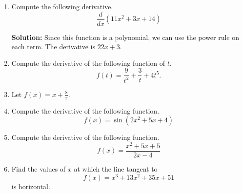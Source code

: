 \documentclass{article}
\begin{document}
\ActivityTitle[class=Calculus I, number=3, name=Differentiation I (Solutions)]

\begin{enumerate}
\item Compute the following derivative. \[ \frac{d}{dx} \left( 11 x^2 + 3 x + 14 \right) \]

\textbf{Solution:}
Since this function is a polynomial, we can use the power rule on each term. The derivative is $22 x + 3$.

  
\vspace{1cm}

\item Compute the derivative of the following function of $t$. \[ f(t) = \frac{9}{t^{2}} + \frac{3}{t} + 4 t^{5}. \]

  
\vspace{1cm}

\item Let $f(x) = x + \frac{8}{x}$.

  
\vspace{1cm}

\item Compute the derivative of the following function. \[ f(x) = \sin(2 x^2 + 5 x + 4) \]

  
\vspace{1cm}

\item Compute the derivative of the following function. \[ f(x) = \frac{x^2 + 5 x + 5}{2 x - 4} \]

  
\vspace{1cm}

\item Find the values of $x$ at which the line tangent to \[ f(x) = x^3 + 13 x^2 + 35 x + 51 \] is horizontal.

  
\vspace{1cm}
\end{enumerate}
\end{document}
